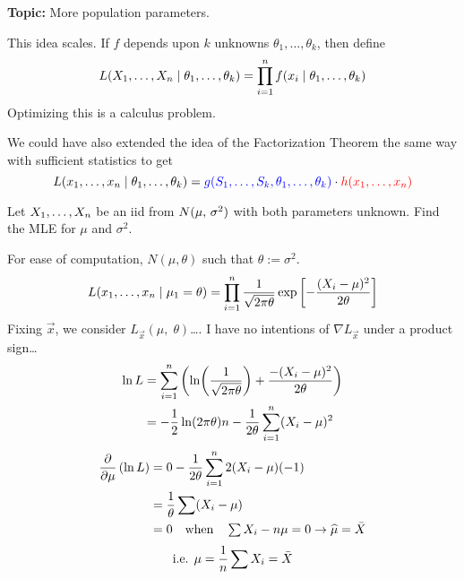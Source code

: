 \nnl \textbf{Topic: } More population parameters.

\nl This idea scales. If $f$ depends upon $k$ unknowns $\theta_1, \dots, \theta_k$, then define
$$L({X}_1, \dots, {X}_n \mid \theta_1, \dots, \theta_k) = \prod_{i=1}^n f(x_i \mid \theta_1, \dots, \theta_k)$$
Optimizing this is a calculus problem.

\remark* We could have also extended the idea of the Factorization Theorem the same way with sufficient statistics to get 
$$L({x}_1, \dots, {x}_n \mid \theta_1, \dots, \theta_k) = \color{blue}{g(S_1, \dots, S_k, \theta_1, \dots, \theta_k) }\color{black}\cdot \color{red}{h({x}_1, \dots, {x}_n)}\color{black}$$

\example* Let ${X}_1, \dots, {X}_n$ be an iid from $\normalDist*$ with both parameters unknown. Find the MLE for $\mu$ and $\sigma^2$.

\nl For ease of computation, $N(\mu, \theta)$ such that $\theta := \sigma^2$.
$$L(\thru{x} \mid \mu_1 = \theta) = \prod_{i=1}^n \over{\sqrt{2\pi\theta}}\exp\brac{-\dfrac{(X_i-\mu)^2}{2\theta}}$$
Fixing $\vec{x}$, we consider $L_{\vec{x}}(\mu,\;\theta)$\dots. I have no intentions of $\nabla L_{\vec{x}}$ under a product sign\dots
\begin{align*}
    \ln L &= \sum_{i=1}^n \pars{\ln(\over{\sqrt{2\pi\theta}}) + \dfrac{-(X_i-\mu)^2}{2\theta}}\\
    &= - \over{2} \ln (2\pi\theta)n - \over{2\theta} \sum_{i=1}^n (X_i-\mu)^2
\end{align*}
\begin{align*}
    \pdv{}{\mu}\pars{\ln L} &= 0 - \over{2\theta} \sum_{i=1}^n 2(X_i-\mu)(-1)\\
    &= \over{\theta} \sum (X_i-\mu)\\
    &= 0 \quad \text{when} \quad \textstyle \sum X_i - n\mu = 0 \rightarrow \widehat{\mu} = \Xbar 
\end{align*}
$$\text{i.e. } \mu = \dfrac{1}{n}\sum X_i = \bar{X}$$

